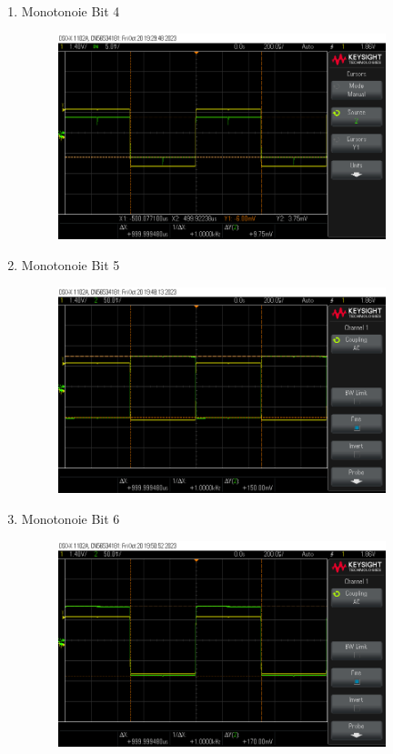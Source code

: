 {\begin{enumerate}[label=\Alph*.]
\begin{figure}[H]
	\end{figure}
	\item Monotonoie Bit 4
	\begin{figure}[H]
		\centering
		\includegraphics[height=6cm]{images/monotonie 4bit.png} 
	\end{figure}
	\item Monotonoie Bit 5
	\begin{figure}[H]
		\centering
		\includegraphics[height=6cm]{images/monotonie 5bit (150mv).png} 
	\end{figure}
	\pagebreak
	\item Monotonoie Bit 6
	\begin{figure}[H]
		\centering
		\includegraphics[height=6cm]{images/monotonie 6-8bit(170mv).png} 
	\end{figure}

\end{enumerate}}
